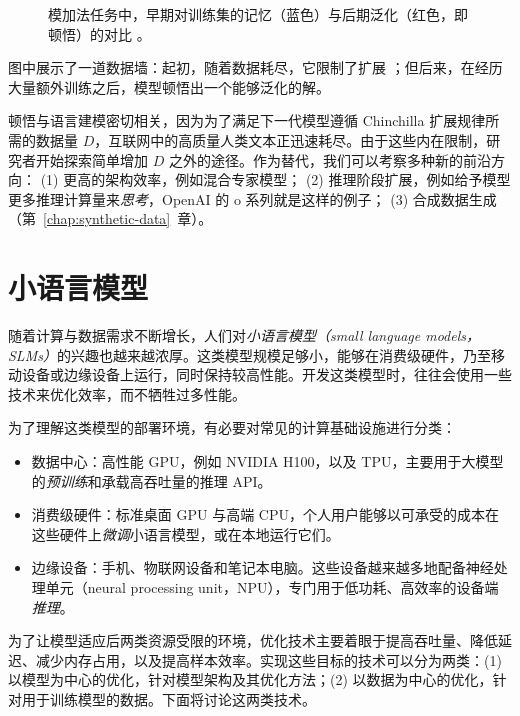 \begin{figure}
    \centering
    
    \caption{模加法任务中，早期对训练集的记忆（蓝色）与后期泛化（红色，即顿悟）的对比 \citep{nanda2023progress}。}
    \label{fig:grokking}
\end{figure}

图中展示了一道数据墙：起初，随着数据耗尽，它限制了扩展 \citep{villalobos2024position}；但后来，在经历大量额外训练之后，模型顿悟出一个能够泛化的解。

顿悟与语言建模密切相关，因为为了满足下一代模型遵循 Chinchilla 扩展规律所需的数据量 $D$，互联网中的高质量人类文本正迅速耗尽。由于这些内在限制，研究者开始探索简单增加 $D$ 之外的途径。作为替代，我们可以考察多种新的前沿方向：
(1) 更高的架构效率，例如混合专家模型；
(2) 推理阶段扩展，例如给予模型更多推理计算量来{\em 思考}，OpenAI 的 o 系列就是这样的例子；
(3) 合成数据生成（第~\ref{chap:synthetic-data}~章）。

\section{小语言模型}
\label{sec:small-models}
随着计算与数据需求不断增长，人们对\emph{小语言模型（small language models，SLMs）}的兴趣也越来越浓厚。这类模型规模足够小，能够在消费级硬件，乃至移动设备或边缘设备上运行，同时保持较高性能。开发这类模型时，往往会使用一些技术来优化效率，而不牺牲过多性能。

为了理解这类模型的部署环境，有必要对常见的计算基础设施进行分类：
\begin{itemize}
    \item 数据中心：高性能 GPU，例如 NVIDIA H100，以及 TPU，主要用于大模型的{\em 预训练}和承载高吞吐量的推理 API。

    \item 消费级硬件：标准桌面 GPU 与高端 CPU，个人用户能够以可承受的成本在这些硬件上{\em 微调}小语言模型，或在本地运行它们。

    \item 边缘设备：手机、物联网设备和笔记本电脑。这些设备越来越多地配备神经处理单元（neural processing unit，NPU），专门用于低功耗、高效率的设备端{\em 推理}。
\end{itemize}

为了让模型适应后两类资源受限的环境，优化技术主要着眼于提高吞吐量、降低延迟、减少内存占用，以及提高样本效率。实现这些目标的技术可以分为两类：(1) 以模型为中心的优化，针对模型架构及其优化方法；(2) 以数据为中心的优化，针对用于训练模型的数据。下面将讨论这两类技术。

